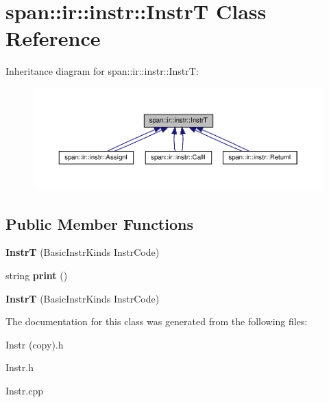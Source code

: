 \hypertarget{classspan_1_1ir_1_1instr_1_1InstrT}{}\section{span\+:\+:ir\+:\+:instr\+:\+:InstrT Class Reference}
\label{classspan_1_1ir_1_1instr_1_1InstrT}


Inheritance diagram for span\+:\+:ir\+:\+:instr\+:\+:InstrT\+:\nopagebreak
\begin{figure}[H]
\begin{center}
\leavevmode
\includegraphics[width=350pt]{classspan_1_1ir_1_1instr_1_1InstrT__inherit__graph}
\end{center}
\end{figure}
\subsection*{Public Member Functions}
\begin{DoxyCompactItemize}
\item 
\mbox{\label{classspan_1_1ir_1_1instr_1_1InstrT_ad669661a2dddf4076b70b574340cda89}} 
{\bfseries InstrT} (Basic\+Instr\+Kinds Instr\+Code)
\item 
\mbox{\label{classspan_1_1ir_1_1instr_1_1InstrT_ad2de1b4476eb459cd511366152ca5a89}} 
string {\bfseries print} ()
\item 
\mbox{\label{classspan_1_1ir_1_1instr_1_1InstrT_afc0c85ffba82d580871e524aa42a951d}} 
{\bfseries InstrT} (Basic\+Instr\+Kinds Instr\+Code)
\end{DoxyCompactItemize}


The documentation for this class was generated from the following files\+:\begin{DoxyCompactItemize}
\item 
Instr (copy).\+h\item 
Instr.\+h\item 
Instr.\+cpp\end{DoxyCompactItemize}
